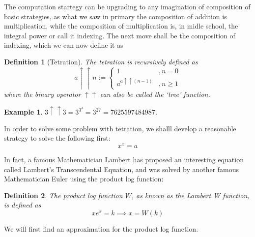 \documentclass[12pt]{article}
\newtheorem{definition}{Definition}
\newtheorem*{example}{Example}
\begin{document}
    The computation startegy can be upgrading to any imagination of composition of basic strategies, as what we saw in primary the composition of addition is multiplication, while the composition of multiplication is, in midle school, the integral power or call it indexing. The next move shall be the composition of indexing, which we can now define it as 

    \begin{definition}[Tetration]
        The tetration is recursively defined as $$a\uparrow\uparrow n :=\begin{cases}
            1&,n=0\\
            a^{a\uparrow\uparrow (n-1)}&, n\geq 1
        \end{cases}$$
        where the binary operator $\uparrow\uparrow$ can also be called the `tree' function.
    \end{definition}

    \begin{example}
        $3\uparrow\uparrow 3=3^{3^3}=3^{27}=7625597484987$.
    \end{example}

    In order to solve some problem with tetration, we shalll develop a reasonable strategy to solve the following first: $$x^x=a$$

    In fact, a famous Mathematician Lambert has proposed an interesting equation called Lambert's Transcendental Equation, and was solved by another famous Mathematician Euler using the product log function:

    \begin{definition}
        The product log function $W$, as known as the Lambert W function, is defined as $$xe^x=k \implies x=W(k)$$
    \end{definition}

    We will first find an approximation for the product log function.
\end{document}
